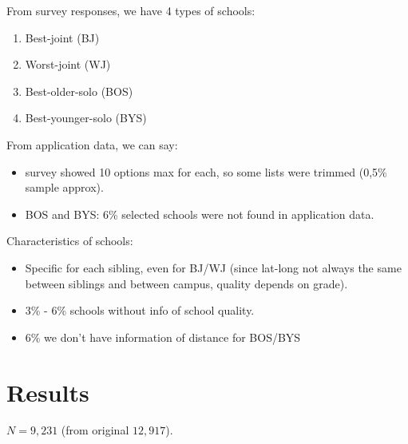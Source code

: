 \documentclass{article}
\begin{document}
From survey responses, we have 4 types of schools:
\begin{enumerate}
    \item Best-joint (BJ)
    \item Worst-joint (WJ)
    \item Best-older-solo (BOS)
    \item Best-younger-solo (BYS)
\end{enumerate}
From application data, we can say:
\begin{itemize}
    \item survey showed 10 options max for each, so some lists were trimmed (0,5\% sample approx).
    \item BOS and BYS: 6\% selected schools were not found in application data.
\end{itemize}
Characteristics of schools:
\begin{itemize}
    \item Specific for each sibling, even for BJ/WJ (since lat-long not always the same between siblings and between campus, quality depends on grade).
    \item 3\% - 6\% schools without info of school quality.
    \item 6\% we don't have information of distance for BOS/BYS
\end{itemize}

\section{Results}

$N= 9,231$ (from original $12,917$). 
\end{document}

